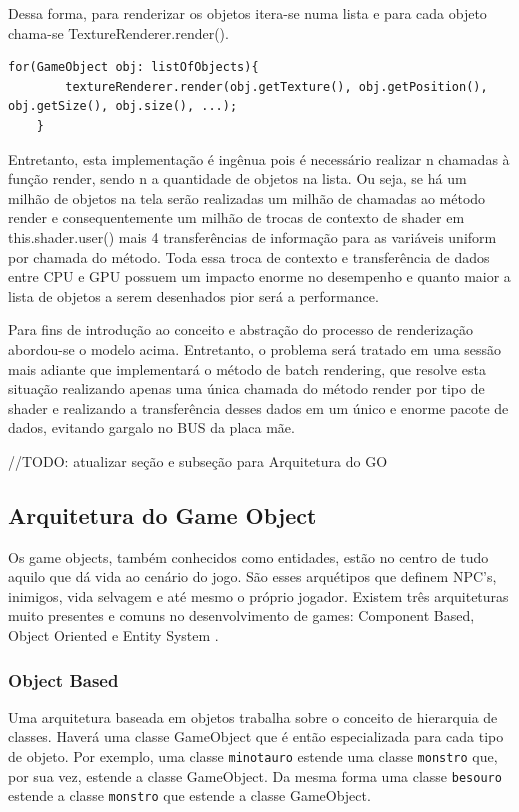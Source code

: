 \documentclass[12pt, 
openright, 
oneside, 
a4paper,    
brazil]{facom-ufu-abntex2}
\begin{document}
Dessa forma, para renderizar os objetos itera-se numa lista e para cada objeto chama-se TextureRenderer.render().

\begin{lstlisting}[caption=Demonstração do render]
	for(GameObject obj: listOfObjects){
		textureRenderer.render(obj.getTexture(), obj.getPosition(), obj.getSize(), obj.size(), ...);
	}
\end{lstlisting}

Entretanto, esta implementação é ingênua pois é necessário realizar n chamadas à função render, sendo n a quantidade de objetos na lista. Ou seja, se há um milhão de objetos na tela serão realizadas um milhão de chamadas ao método render e consequentemente um milhão de trocas de contexto de shader em this.shader.user() mais 4 transferências de informação para as variáveis uniform por chamada do método. Toda essa troca de contexto e transferência de dados entre CPU e GPU possuem um impacto enorme no desempenho e quanto maior a lista de objetos a serem desenhados pior será a performance.

Para fins de introdução ao conceito e abstração do processo de renderização  abordou-se o modelo acima. Entretanto, o problema será tratado em uma sessão mais adiante que implementará o método de batch rendering, que resolve esta situação realizando apenas uma única chamada do método render por tipo de shader e realizando a transferência desses dados em um único e enorme pacote de dados, evitando gargalo no BUS da placa mãe.


//TODO: atualizar seção e subseção para Arquitetura do GO
\subsection{Arquitetura do Game Object}

Os game objects, também conhecidos como entidades, estão no centro de tudo aquilo que dá vida ao cenário do jogo. São esses arquétipos que definem NPC's, inimigos, vida selvagem e até mesmo o próprio jogador. Existem três arquiteturas muito presentes e comuns no desenvolvimento de games: Component Based, Object Oriented e Entity System \cite{GameObjectArchitecture}. 

\subsubsection{Object Based}
Uma arquitetura baseada em objetos trabalha sobre o conceito de hierarquia de classes. Haverá uma classe GameObject que é então especializada para cada tipo de objeto. Por exemplo, uma classe \texttt{minotauro} estende uma classe \texttt{monstro} que, por sua vez, estende a classe GameObject. Da mesma forma uma classe \texttt{besouro} estende a classe \texttt{monstro} que estende a classe GameObject.
\end{document}
